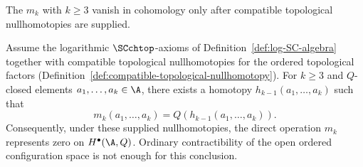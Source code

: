 The $m_k$ with $k \geq 3$ vanish in cohomology only after compatible
topological nullhomotopies are supplied.
\begin{proposition}
Assume the logarithmic $\SCchtop$-axioms of
Definition~\ref{def:log-SC-algebra} together with compatible topological
nullhomotopies for the ordered topological factors
(Definition~\ref{def:compatible-topological-nullhomotopy}).
For $k \geq 3$ and $Q$-closed elements $a_1,\ldots,a_k \in \A$, there exists a homotopy $h_{k-1}(a_1,\ldots,a_k)$ such that
\[
m_k(a_1,\ldots,a_k) = Q(h_{k-1}(a_1,\ldots,a_k)).
\]
Consequently, under these supplied nullhomotopies, the direct
operation \(m_k\) represents zero on \(H^\bullet(\A,Q)\).  Ordinary
contractibility of the open ordered configuration space is not enough
for this conclusion.
\end{proposition}
